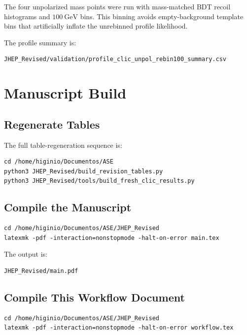 \documentclass[11pt]{article}
\begin{document}
The four unpolarized mass points were run with mass-matched BDT recoil
histograms and $100~\mathrm{GeV}$ bins.  This binning avoids empty-background
template bins that artificially inflate the unrebinned profile likelihood.

The profile summary is:

\begin{lstlisting}
JHEP_Revised/validation/profile_clic_unpol_rebin100_summary.csv
\end{lstlisting}

\section{Manuscript Build}

\subsection{Regenerate Tables}

The full table-regeneration sequence is:

\begin{lstlisting}
cd /home/higinio/Documentos/ASE
python3 JHEP_Revised/build_revision_tables.py
python3 JHEP_Revised/tools/build_fresh_clic_results.py
\end{lstlisting}

\subsection{Compile the Manuscript}

\begin{lstlisting}
cd /home/higinio/Documentos/ASE/JHEP_Revised
latexmk -pdf -interaction=nonstopmode -halt-on-error main.tex
\end{lstlisting}

The output is:

\begin{lstlisting}
JHEP_Revised/main.pdf
\end{lstlisting}

\subsection{Compile This Workflow Document}

\begin{lstlisting}
cd /home/higinio/Documentos/ASE/JHEP_Revised
latexmk -pdf -interaction=nonstopmode -halt-on-error workflow.tex
\end{lstlisting}
\end{document}
